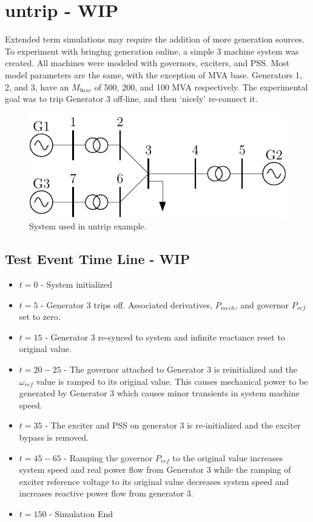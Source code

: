 \section{untrip - WIP}

Extended term simulations may require the addition of more generation sources.
To experiment with bringing generation online, a simple 3 machine system was created.
All machines were modeled with governors, exciters, and PSS.
Most model parameters are the same, with the exception of MVA base.
Generators 1, 2, and 3, have an $M_{base}$ of 500, 200, and 100 MVA respectively.
The experimental goal was to trip Generator 3 off-line, and then `nicely' re-connect it.



\begin{figure}[H]
	\centering
	\footnotesize
	\includegraphics[width=.6\linewidth]{examples/untrip/200831-3mach7bus}
	\caption{System used in untrip example.}
	\label{fig: untrip 1}
\end{figure}%

\subsection{Test Event Time Line - WIP}
\begin{itemize}
 em
\singlespacing
\item $t=0$ - System initialized
\item $t=5$ - Generator 3 trips off.
Associated derivatives, $P_{mech}$, and governor $P_{ref}$ set to zero.
\item $t=15$ - Generator 3 re-synced to system and infinite reactance reset to original value. 

\item $t=20-25$ - The governor attached to Generator 3 is reinitialized and the $\omega_{ref}$ value is ramped to its original value. 
This causes mechanical power to be generated by Generator 3 which causes minor transients in system machine speed.
\item $t=35$ - The exciter and PSS on generator 3 is re-initialized and the exciter bypass is removed.
\item $t=45-65$ - Ramping the governor $P_{ref}$ to the original value increases system speed  and real power flow from Generator 3 while the ramping of exciter reference voltage to its original value decreases system speed and increases reactive power flow from generator 3.
\item $t=150$ - Simulation End
\end{itemize}

